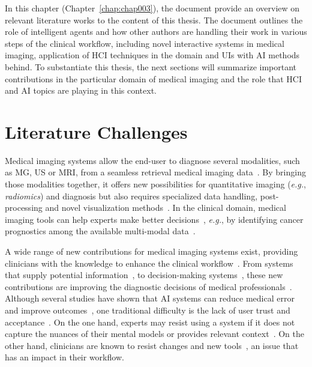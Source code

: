 \clearpage
\label{chap:chap003}

In this chapter (Chapter~\ref{chap:chap003}), the document provide an overview on relevant literature works to the content of this thesis.
The document outlines the role of intelligent agents and how other authors are handling their work in various steps of the clinical workflow, including novel interactive systems in medical imaging, application of \ac{HCI} techniques in the domain and \acp{UI} with \ac{AI} methods behind.
To substantiate this thesis, the next sections will summarize important contributions in the particular domain of medical imaging and the role that \ac{HCI} and \ac{AI} topics are playing in this context.

\section{Literature Challenges}
\label{sec:chap003001}

Medical imaging systems allow the end-user to diagnose several modalities, such as \ac{MG}, \ac{US} or \ac{MRI}, from a seamless retrieval medical imaging data~\cite{faraji2019radiologic, seifabadi2019correlation}.
By bringing those modalities together, it offers new possibilities for quantitative imaging ({\it e.g.}, {\it radiomics}) and diagnosis but also requires specialized data handling, post-processing and novel visualization methods~\cite{Igarashi:2016:IVS:2984511.2984537, Ocegueda-Hernandez:2016:CMN:2876456.2879485, Sousa:2017:VVR:3025453.3025566}.
In the clinical domain, medical imaging tools can help experts make better decisions~\cite{Lopes:2017:UHC:3143820.3144118}, {\it e.g.}, by identifying cancer prognostics among the available multi-modal data~\cite{lopes2018interaction}.

A wide range of new contributions for medical imaging systems exist, providing clinicians with the knowledge to enhance the clinical workflow~\cite{Cai:2019:HTC:3290605.3300234, edge2019clinical}.
From systems that supply potential information~\cite{10.1145/3399715.3399744, 10.1145/3206505.3206555}, to decision-making systems~\cite{10.1145/3290605.3300468, 10.1145/3359206}, these new contributions are improving the diagnostic decisions of medical professionals~\cite{hwang2019artificial}.
Although several studies have shown that \ac{AI} systems can reduce medical error and improve outcomes~\cite{Cai:2019:HTC:3290605.3300234, Cai:2019:EEE:3301275.3302289}, one traditional difficulty is the lack of user trust and acceptance~\cite{https://doi.org/10.1002/mp.13562}.
On the one hand, experts may resist using a system if it does not capture the nuances of their mental models or provides relevant context~\cite{khairat2018reasons, kohli2018cad, yang2016investigating}.
On the other hand, clinicians are known to resist changes and new tools~\cite{10.1145/3132272.3134111, gagnon2014electronic}, an issue that has an impact in their workflow.

